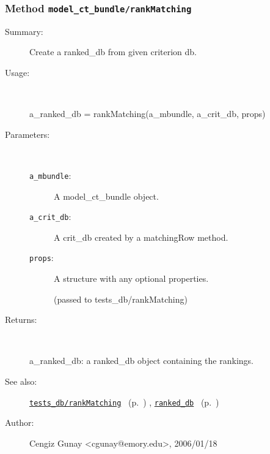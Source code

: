 \subsubsection[Method \texttt{rankMatching}]{Method \texttt{model\_ct\_bundle/rankMatching}}%
%
\label{ref_model_ct_bundle__rankMatching}%
\hypertarget{ref_model_ct_bundle__rankMatching}{}%
\begin{description}
\item[Summary:]Create a ranked\_db from given criterion db.
%
\item[Usage:]~%
\begin{lyxcode}%
a\_ranked\_db = rankMatching(a\_mbundle, a\_crit\_db, props)
%
\end{lyxcode}%
%
%
\item[Parameters:]~
\begin{description}%
\item[\texttt{a\_mbundle}:]
 A model\_ct\_bundle object.
\item[\texttt{a\_crit\_db}:]
 A crit\_db created by a matchingRow method.
\item[\texttt{props}:]
 A structure with any optional properties.

(passed to tests\_db/rankMatching)
\end{description}%
%
\item[Returns:
]~

	a\_ranked\_db: a ranked\_db object containing the rankings.
%
%
\item[See also:]%
\hyperlink{ref_tests_db__rankMatching}{\texttt{tests\_db/rankMatching}}%
\ (p.~\pageref{ref_tests_db__rankMatching})%
%
, \hyperlink{ref_ranked_db}{\texttt{ranked\_db}}%
\ (p.~\pageref{ref_ranked_db})%
%
%
\item[Author:]%
Cengiz Gunay <cgunay@emory.edu>, 2006/01/18
%
\end{description}
\methodline%
